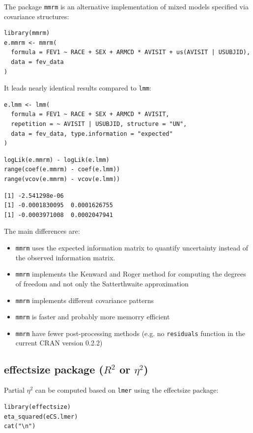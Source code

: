 \documentclass[12pt]{article}
\begin{document}
The package \texttt{mmrm} is an alternative implementation of mixed models
specified via covariance structures:
\lstset{language=r,label= ,caption= ,captionpos=b,numbers=none}
\begin{lstlisting}
library(mmrm)
e.mmrm <- mmrm(
  formula = FEV1 ~ RACE + SEX + ARMCD * AVISIT + us(AVISIT | USUBJID),
  data = fev_data
)
\end{lstlisting}

It leads nearly identical results compared to \texttt{lmm}:
\lstset{language=r,label= ,caption= ,captionpos=b,numbers=none}
\begin{lstlisting}
e.lmm <- lmm(
  formula = FEV1 ~ RACE + SEX + ARMCD * AVISIT,
  repetition = ~ AVISIT | USUBJID, structure = "UN",
  data = fev_data, type.information = "expected"
)
\end{lstlisting}
\lstset{language=r,label= ,caption= ,captionpos=b,numbers=none}
\begin{lstlisting}
logLik(e.mmrm) - logLik(e.lmm)
range(coef(e.mmrm) - coef(e.lmm))
range(vcov(e.mmrm) - vcov(e.lmm))
\end{lstlisting}

\begin{verbatim}
[1] -2.541298e-06
[1] -0.0001830095  0.0001626755
[1] -0.0003971008  0.0002047941
\end{verbatim}


The main differences are:
\begin{itemize}
\item \texttt{mmrm} uses the expected information matrix to quantify uncertainty
instead of the observed information matrix.
\item \texttt{mmrm} implements the Kenward and Roger method for computing the degrees of
freedom and not only the Satterthwaite approximation
\item \texttt{mmrm} implements different covariance patterns
\item \texttt{mmrm} is faster and probably more memorry efficient
\item \texttt{mmrm} have fewer post-processing methods (e.g. no \texttt{residuals}
function in the current CRAN version 0.2.2)
\end{itemize}

\subsection{effectsize package (\(R^2\) or \(\eta^2\))}
\label{sec:orgf50520b}

Partial \(\eta^2\) can be computed based on \texttt{lmer} using the effectsize package:
\lstset{language=r,label= ,caption= ,captionpos=b,numbers=none}
\begin{lstlisting}
library(effectsize)
eta_squared(eCS.lmer)
cat("\n")
\end{lstlisting}
\end{document}

